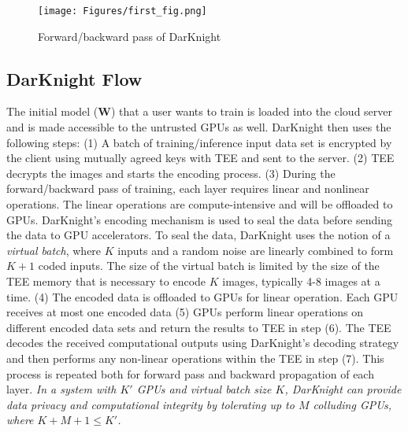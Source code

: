 \begin{figure}
 \centering
 \texttt{[image: Figures/first\_fig.png]}
 \caption{Forward/backward pass of DarKnight}
 \label{fig:model1}
 \vskip -0.2in
\end{figure}
\subsection{DarKnight Flow}
The initial model ($\mathbf{W}$)  that a user wants to train is loaded into the cloud server and is made accessible to the untrusted GPUs as well. DarKnight then uses the following steps: (1) A batch of training/inference input data set is encrypted by the client using mutually agreed keys with TEE and sent to the server. (2) TEE decrypts the images and starts the encoding process. (3) During the forward/backward pass of training, each layer requires linear and nonlinear operations. The linear operations are compute-intensive and will be offloaded to GPUs.  DarKnight's encoding mechanism is used to seal the data before sending the data to GPU accelerators. To seal the data, DarKnight uses the notion of a \textit{virtual batch}, where $K$ inputs and a random noise are linearly combined to form $K+1$ coded inputs. %
The size of the virtual batch is limited by the size of the TEE memory that is necessary to encode $K$ images, typically 4-8 images at a time.  
(4) The encoded data is offloaded to GPUs for linear operation. Each GPU receives at most one encoded data (5) GPUs perform linear operations on different encoded data sets and return the results to TEE in step (6). The TEE decodes the received computational outputs using DarKnight's decoding strategy and then performs any non-linear operations within the TEE in step (7). This process is repeated both for forward pass and backward propagation of each layer.   
\emph{In a system with $K'$ GPUs and virtual batch size $K$, DarKnight can provide data privacy and computational integrity by tolerating up to $M$ colluding GPUs, where $K+M+1 \leq K'$.}
